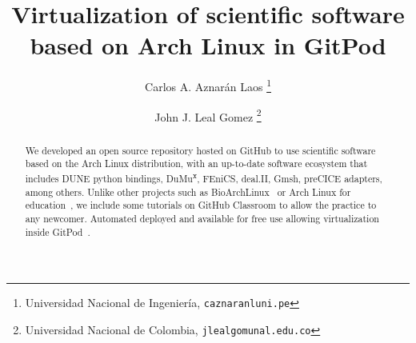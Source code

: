 \documentclass[a4paper,abstract=true]{scrartcl}
\date{}
\title{Virtualization of scientific software based on Arch Linux in GitPod}
\author{Carlos A. Aznarán Laos
\thanks{
  Universidad Nacional de Ingeniería,
\texttt{caznaranl\MVAt uni.pe}}
    \and John J. Leal Gomez
    \thanks{
    Universidad Nacional de Colombia,
		\texttt{jlealgom\MVAt unal.edu.co}}
}
\begin{document}
\maketitle

\begin{abstract}
	We developed an open source repository hosted on GitHub to use
	scientific software based on the Arch Linux distribution,
	with an up-to-date software ecosystem that includes DUNE
	python bindings, DuMu\textsuperscript{x}, FEniCS,
	deal.II, Gmsh, preCICE adapters, among others.
	Unlike other projects such as BioArchLinux~\cite{bioarchlinux_2022}
	or Arch Linux for education~\cite{arch4edu2019},
	we include some tutorials on GitHub Classroom to allow the practice
	to any newcomer.
	Automated deployed and available for free use allowing virtualization inside
	GitPod~\cite{gitpod_2022}.
\end{abstract}


\end{document}

